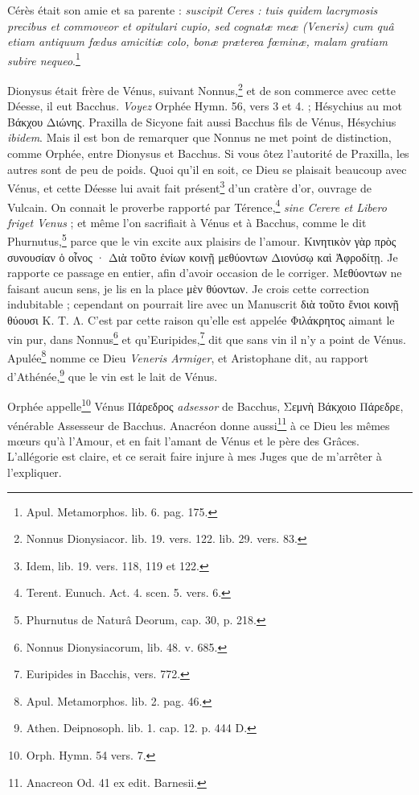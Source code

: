 \documentclass[a4paper, 18pt, oneside]{article}
\begin{document}
Cérès était son amie et sa parente : \emph{suscipit Ceres : tuis quidem lacrymosis precibus et commoveor et opitulari cupio, sed cognatæ meæ (Veneris) cum quâ etiam antiquum fœdus amicitiæ colo, bonæ præterea fœminæ, malam gratiam subire nequeo}.\footnote{Apul. Metamorphos. lib. 6. pag. 175.}

Dionysus était frère de Vénus, suivant Nonnus,\footnote{Nonnus Dionysiacor. lib. 19. vers. 122. lib. 29. vers. 83.} et de son commerce avec cette Déesse, il eut Bacchus. \emph{Voyez} Orphée Hymn. 56, vers 3 et 4. ; Hésychius au mot Βάκχου Διώνης. Praxilla de Sicyone fait aussi Bacchus fils de Vénus, Hésychius \emph{ibidem}. Mais il est bon de remarquer que Nonnus ne met point de distinction, comme Orphée, entre Dionysus et Bacchus. Si vous ôtez l'autorité de Praxilla, les autres sont de peu de poids. Quoi qu'il en soit, ce Dieu se plaisait beaucoup avec Vénus, et cette Déesse lui avait fait présent\footnote{Idem, lib. 19. vers. 118, 119 et 122.} d'un cratère d'or, ouvrage de Vulcain. On connait le proverbe rapporté par Térence,\footnote{Terent. Eunuch. Act. 4. scen. 5. vers. 6.} \emph{sine Cerere et Libero friget Venus} ; et même l'on sacrifiait à Vénus et à Bacchus, comme le dit Phurnutus,\footnote{Phurnutus de Naturâ Deorum, cap. 30, p. 218.} parce que le vin excite aux plaisirs de l'amour. Κινητικὸν γὰρ πρὸς συνουσίαν ὁ οἶνος · Διὰ τοῦτο ἐνίων κοινῇ μεθύοντων Διονύσῳ καὶ Ἀφροδίτῃ. Je rapporte ce passage en entier, afin d'avoir occasion de le corriger. Μεθύοντων ne faisant aucun sens, je lis en la place μὲν θύοντων. Je crois cette correction indubitable ; cependant on pourrait lire avec un Manuscrit διὰ τοῦτο ἔνιοι κοινῇ θύουσι Κ. Τ. Λ. C'est par cette raison qu'elle est appelée Φιλάκρητος aimant le vin pur, dans Nonnus\footnote{Nonnus Dionysiacorum, lib. 48. v. 685.} et qu'Euripides,\footnote{Euripides in Bacchis, vers. 772.} dit que sans vin il n'y a point de Vénus. Apulée\footnote{Apul. Metamorphos. lib. 2. pag. 46.} nomme ce Dieu \emph{Veneris Armiger}, et Aristophane dit, au rapport d'Athénée,\footnote{Athen. Deipnosoph. lib. 1. cap. 12. p. 444 D.} que le vin est le lait de Vénus.

Orphée appelle\footnote{Orph. Hymn. 54 vers. 7.} Vénus Πάρεδρος \emph{adsessor} de Bacchus, Σεμνὴ Βάκχοιο Πάρεδρε, vénérable Assesseur de Bacchus. Anacréon donne aussi\footnote{Anacreon Od. 41 ex edit. Barnesii.} à ce Dieu les mêmes mœurs qu'à l'Amour, et en fait l'amant de Vénus et le père des Grâces. L'allégorie est claire, et ce serait faire injure à mes Juges que de m'arrêter à l'expliquer.
\end{document}
